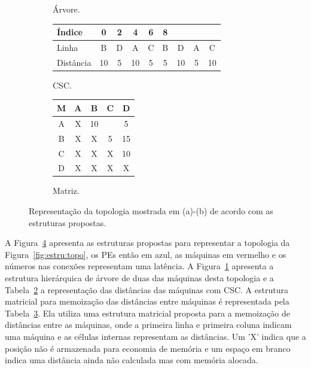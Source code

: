 \begin{figure}[t]
\begin{subfigure}{.5\textwidth}
    \caption{Árvore.}
    \label{fig:estru:arvore}
\end{subfigure}
\begin{subfigure}{.5\textwidth}
    \centering
    \begin{tabular}{|l|c|c|c|c|c|c|c|c|}
        \cline{1-6}
        Índice     & 0 & 2  & 4 & 6 & 8  \\ \hline
        Linha      & B & D & A & C & B & D & A & C  \\ \hline
        Distância  & 10 & 5 & 10 & 5 & 5 & 10 & 5 & 10 \\ \hline
    \end{tabular}
    \caption{CSC.}
    \label{fig:estru:csc}
\end{subfigure}
\begin{subfigure}{.5\textwidth}
    \centering
    \begin{tabular}{|c|c|c|c|c|}
        \hline
         M & A & B  & C & D  \\ \hline
         A & X & 10 &   & 5  \\ \hline
         B & X & X  & 5 & 15 \\ \hline
         C & X & X  & X & 10  \\ \hline
         D & X & X  & X & X  \\ \hline
    \end{tabular}
    \caption{Matriz.}
    \label{fig:estru:matriz}
\end{subfigure}
\caption[Representação das estruturas utilizadas.]{Representação da topologia mostrada em (a)-(b) de acordo com as estruturas propostas.}
\label{fig:estru}
\end{figure}

A Figura~\ref{fig:estru} apresenta as estruturas propostas para representar a topologia da Figura~\ref{fig:estru:topo}, os PEs então em azul, as máquinas em vermelho e os números nas conexões representam uma latência. 
A Figura~\ref{fig:estru:arvore} apresenta a estrutura hierárquica de árvore de duas das máquinas desta topologia e a Tabela~\ref{fig:estru:csc} a representação das distâncias das máquinas com CSC. 
A estrutura matricial para memoização das distâncias entre máquinas é representada pela Tabela~\ref{fig:estru:matriz}. Ela utiliza uma estrutura matricial proposta para a memoização de distâncias entre as máquinas, onde a primeira linha e primeira coluna indicam uma máquina e as células internas representam as distâncias.
Um 'X' indica que a posição não é armazenada para economia de memória e um espaço em branco indica uma distância ainda não calculada mas com memória alocada.

